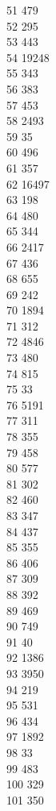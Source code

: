 { 51	479 \\
 52	295 \\
 53	443 \\
 54	19248 \\
 55	343 \\
 56	383 \\
 57	453 \\
 58	2493 \\
 59	35 \\
 60	496 \\
 61	357 \\
 62	16497 \\
 63	198 \\
 64	480 \\
 65	344 \\
 66	2417 \\
 67	436 \\
 68	655 \\
 69	242 \\
 70	1894 \\
 71	312 \\
 72	4846 \\
 73	480 \\
 74	815 \\
 75	33 \\
 76	5191 \\
 77	311 \\
 78	355 \\
 79	458 \\
 80	577 \\
 81	302 \\
 82	460 \\
 83	347 \\
 84	437 \\
 85	355 \\
 86	406 \\
 87	309 \\
 88	392 \\
 89	469 \\
 90	749 \\
 91	40 \\
 92	1386 \\
 93	3950 \\
 94	219 \\
 95	531 \\
 96	434 \\
 97	1892 \\
 98	33 \\
 99	483 \\
 100	329 \\
 101	350 \\
}
